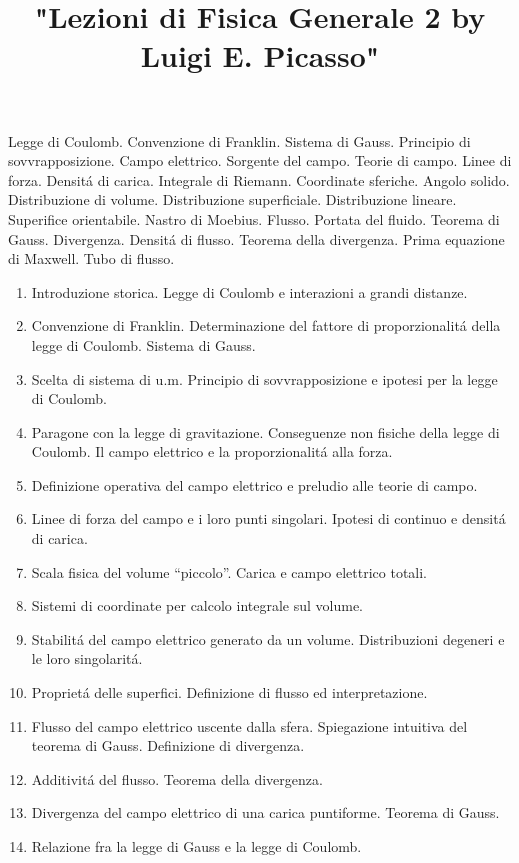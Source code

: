 

\usepackage[italian]{babel}

\title{"Lezioni di Fisica Generale 2 by Luigi E. Picasso"}


\maketitle

\begin{multicols}{3}
  Legge di Coulomb. Convenzione di Franklin. Sistema di Gauss. Principio di sovvrapposizione.
  Campo elettrico. Sorgente del campo. Teorie di campo. Linee di forza. Densit\'a di carica.
  Integrale di Riemann. Coordinate sferiche. Angolo solido. Distribuzione di volume.
  Distribuzione superficiale. Distribuzione lineare. Superifice orientabile. Nastro di Moebius. Flusso.
  Portata del fluido. Teorema di Gauss. Divergenza. Densit\'a di flusso. Teorema della divergenza.
  Prima equazione di Maxwell. Tubo di flusso.
\end{multicols}

\begin{multicols}{3}
  \begin{enumerate}
  \item Introduzione storica. Legge di Coulomb e interazioni a grandi distanze.
  \item Convenzione di Franklin. Determinazione del fattore di proporzionalit\'a della legge di Coulomb.
    Sistema di Gauss.
  \item Scelta di sistema di u.m. Principio di sovvrapposizione e ipotesi per la legge di Coulomb.
  \item Paragone con la legge di gravitazione. Conseguenze non fisiche della legge di Coulomb. Il campo elettrico e la proporzionalit\'a alla forza.
  \item Definizione operativa del campo elettrico e preludio alle teorie di campo.
  \item Linee di forza del campo e i loro punti singolari. Ipotesi di continuo e densit\'a di carica.
  \item Scala fisica del volume ``piccolo''. Carica e campo elettrico totali.
  \item Sistemi di coordinate per calcolo integrale sul volume.
  \item Stabilit\'a del campo elettrico generato da un volume. Distribuzioni degeneri e le loro singolarit\'a.
  \item Propriet\'a delle superfici. Definizione di flusso ed interpretazione.
  \item Flusso del campo elettrico uscente dalla sfera. Spiegazione intuitiva del teorema di Gauss. Definizione di divergenza.
  \item Additivit\'a del flusso. Teorema della divergenza.
  \item Divergenza del campo elettrico di una carica puntiforme. Teorema di Gauss.
  \item Relazione fra la legge di Gauss e la legge di Coulomb.
  \end{enumerate}
\end{multicols}

